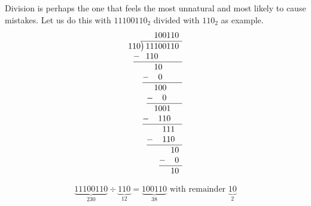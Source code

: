 \documentclass[
]{book}
\begin{document}
\normalsize Division is perhaps the one that feels the most unnatural
and most likely to cause mistakes. Let us do this with \(11100110_2\)
divided with \(110_2\) as example. \begin{equation}\label{eq16}
\begin{array}{r}
100110\phantom{)}   \\
110{\overline{\smash{\big)}\,11100110\phantom{)}}}\\
\underline{-~\phantom{(}110\phantom{99999)}}\\
\phantom{\times{99}}10\phantom{9999)}\\ 
\underline{-~\phantom{()}0\phantom{9999)}}\\ 
\phantom{\times{99}}100\phantom{999)}\\ 
\underline{-~\phantom{()}0\phantom{999)}}\\ 
\phantom{\times{99}}1001\phantom{99)}\\ 
\underline{-~\phantom{()}110\phantom{99)}}\\ 
\phantom{\times{999}}111\phantom{9)}\\ 
\underline{-~\phantom{()}110\phantom{9)}}\\
\phantom{\times{9999}}10\phantom{)}\\ 
\underline{-~\phantom{()}0\phantom{)}}\\  
10\phantom{)}
\end{array}
\end{equation}

\begin{equation} \label{eq17}
    \underbrace{11100110}_\text{230}\div\underbrace{110}_\text{12} = \underbrace{100110}_\text{38} \text{ with remainder }\underbrace{10}_\text{2}
\end{equation}


\backmatter
\end{document}
